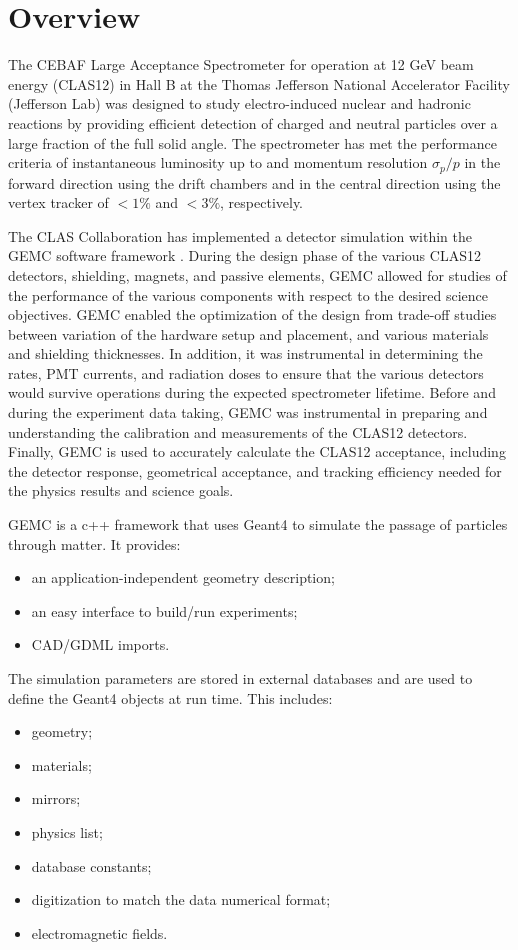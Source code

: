 \section{Overview}

The CEBAF Large Acceptance Spectrometer for operation at 12 GeV beam energy (CLAS12) \cite{clas12-nim} in Hall B at
the Thomas Jefferson National Accelerator Facility (Jefferson Lab) was designed to study
electro-induced nuclear and hadronic reactions by providing efficient detection of charged and neutral particles over a large
fraction of the full solid angle. The spectrometer has met the performance criteria of instantaneous luminosity up
to \cLuminosity and momentum resolution $\sigma_p/p$ in the forward direction using the drift chambers and in the central
direction using the vertex tracker of $< 1\%$ and $< 3\%$, respectively.

The CLAS Collaboration has implemented a detector simulation within the GEMC software framework \cite{GEMC}.
During the design phase of the various CLAS12 detectors, shielding, magnets, and passive elements, GEMC allowed for studies of the
performance of the various components with respect to the desired science objectives.
GEMC enabled the optimization of the design from trade-off studies between variation of the hardware setup and placement,
and various materials and shielding thicknesses.
In addition, it was instrumental in determining the rates, PMT currents, and radiation doses to ensure that the various detectors
would survive operations during the expected spectrometer lifetime.
Before and during the experiment data taking, GEMC was instrumental in preparing and understanding the calibration
and measurements of the CLAS12 detectors.
Finally, GEMC is used to accurately calculate the CLAS12 acceptance, including the detector response, geometrical acceptance,
and tracking efficiency needed for the physics results and science goals.


GEMC is a c++ framework that uses Geant4 \cite{geant4} to simulate the passage of particles through matter. It provides:
\begin{itemize}
	\item an application-independent geometry description;
	\item an easy interface to build/run experiments;
	\item CAD/GDML imports.
\end{itemize}

The simulation parameters are stored in external databases and are used to define the Geant4 objects at run time. This includes:
\begin{itemize}
	\item geometry;
	\item materials;
	\item mirrors;
	\item physics list;
	\item database constants;
	\item digitization to match the data numerical format;
	\item electromagnetic fields.
\end{itemize}

